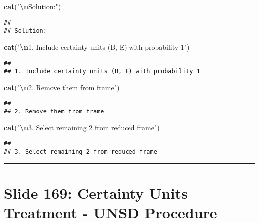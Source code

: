 \documentclass[
]{article}
\newenvironment{Shaded}{\begin{snugshade}}{\end{snugshade}}
\newcommand{\FunctionTok}[1]{\textcolor[rgb]{0.13,0.29,0.53}{\textbf{#1}}}
\newcommand{\NormalTok}[1]{#1}
\newcommand{\SpecialCharTok}[1]{\textcolor[rgb]{0.81,0.36,0.00}{\textbf{#1}}}
\newcommand{\StringTok}[1]{\textcolor[rgb]{0.31,0.60,0.02}{#1}}
\begin{document}
\begin{Shaded}
\begin{Highlighting}[]
\FunctionTok{cat}\NormalTok{(}\StringTok{"}\SpecialCharTok{\textbackslash{}n}\StringTok{Solution:"}\NormalTok{)}
\end{Highlighting}
\end{Shaded}

\begin{verbatim}
## 
## Solution:
\end{verbatim}

\begin{Shaded}
\begin{Highlighting}[]
\FunctionTok{cat}\NormalTok{(}\StringTok{"}\SpecialCharTok{\textbackslash{}n}\StringTok{1. Include certainty units (B, E) with probability 1"}\NormalTok{)}
\end{Highlighting}
\end{Shaded}

\begin{verbatim}
## 
## 1. Include certainty units (B, E) with probability 1
\end{verbatim}

\begin{Shaded}
\begin{Highlighting}[]
\FunctionTok{cat}\NormalTok{(}\StringTok{"}\SpecialCharTok{\textbackslash{}n}\StringTok{2. Remove them from frame"}\NormalTok{)}
\end{Highlighting}
\end{Shaded}

\begin{verbatim}
## 
## 2. Remove them from frame
\end{verbatim}

\begin{Shaded}
\begin{Highlighting}[]
\FunctionTok{cat}\NormalTok{(}\StringTok{"}\SpecialCharTok{\textbackslash{}n}\StringTok{3. Select remaining 2 from reduced frame"}\NormalTok{)}
\end{Highlighting}
\end{Shaded}

\begin{verbatim}
## 
## 3. Select remaining 2 from reduced frame
\end{verbatim}

\begin{center}\rule{0.5\linewidth}{0.5pt}\end{center}

\section{Slide 169: Certainty Units Treatment - UNSD
Procedure}\label{slide-169-certainty-units-treatment---unsd-procedure}
\end{document}
